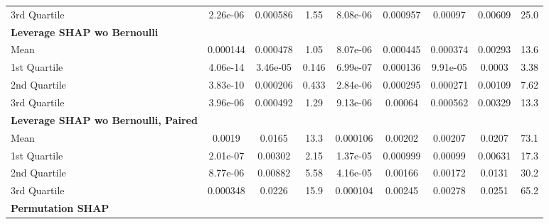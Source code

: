 {\begin{tabular} {lcccccccc}
\hspace{7pt}3rd Quartile & 2.26e-06 & \cellcolor{bronze!60}0.000586 & \cellcolor{bronze!60}1.55 & \cellcolor{silver!60}8.08e-06 & 0.000957 & 0.00097 & 0.00609 & \cellcolor{bronze!60}25.0 \\ 
\addlinespace[1ex] 
\textbf{Leverage SHAP wo Bernoulli} &  &  &  &  &  &  &  &  \\ 
\hspace{7pt}Mean & 0.000144 & \cellcolor{silver!60}0.000478 & \cellcolor{silver!60}1.05 & \cellcolor{bronze!60}8.07e-06 & \cellcolor{gold!60}0.000445 & \cellcolor{silver!60}0.000374 & \cellcolor{gold!60}0.00293 & \cellcolor{gold!60}13.6 \\ 
\hspace{7pt}1st Quartile & 4.06e-14 & \cellcolor{silver!60}3.46e-05 & \cellcolor{silver!60}0.146 & \cellcolor{silver!60}6.99e-07 & \cellcolor{silver!60}0.000136 & \cellcolor{bronze!60}9.91e-05 & \cellcolor{gold!60}0.0003 & \cellcolor{gold!60}3.38 \\ 
\hspace{7pt}2nd Quartile & 3.83e-10 & \cellcolor{silver!60}0.000206 & \cellcolor{silver!60}0.433 & \cellcolor{bronze!60}2.84e-06 & \cellcolor{gold!60}0.000295 & \cellcolor{silver!60}0.000271 & \cellcolor{gold!60}0.00109 & \cellcolor{gold!60}7.62 \\ 
\hspace{7pt}3rd Quartile & 3.96e-06 & \cellcolor{silver!60}0.000492 & \cellcolor{silver!60}1.29 & \cellcolor{bronze!60}9.13e-06 & \cellcolor{silver!60}0.00064 & \cellcolor{silver!60}0.000562 & \cellcolor{gold!60}0.00329 & \cellcolor{gold!60}13.3 \\ 
\addlinespace[1ex] 
\textbf{Leverage SHAP wo Bernoulli, Paired} &  &  &  &  &  &  &  &  \\ 
\hspace{7pt}Mean & 0.0019 & 0.0165 & 13.3 & 0.000106 & 0.00202 & 0.00207 & 0.0207 & 73.1 \\ 
\hspace{7pt}1st Quartile & 2.01e-07 & 0.00302 & 2.15 & 1.37e-05 & 0.000999 & 0.00099 & 0.00631 & 17.3 \\ 
\hspace{7pt}2nd Quartile & 8.77e-06 & 0.00882 & 5.58 & 4.16e-05 & 0.00166 & 0.00172 & 0.0131 & 30.2 \\ 
\hspace{7pt}3rd Quartile & 0.000348 & 0.0226 & 15.9 & 0.000104 & 0.00245 & 0.00278 & 0.0251 & 65.2 \\ 
\addlinespace[1ex] 
\textbf{Permutation SHAP} &  &  &  &  &  &  &  &  \\ 

\end{tabular}}
